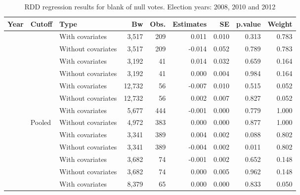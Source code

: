 \documentclass[
  12pt,
]{article}
\begin{document}
\begin{table}[H]

\caption{\label{tab:r.pct.bn}RDD regression results for blank of null votes. Election years: 2008, 2010 and 2012}
\centering
\begin{tabular}[t]{lllrrrrrr}
\toprule
Year & Cutoff & Type & Bw & Obs. & Estimates & SE & p.value & Weight\\
\midrule
 &  & With covariates & 3,517 & 209 & 0.011 & 0.010 & 0.313 & 0.783\\


 & \multirow{-2}{*}{\raggedright\arraybackslash 20000} & Without covariates & 3,517 & 209 & -0.014 & 0.052 & 0.789 & 0.783\\


 &  & With covariates & 3,192 & 41 & 0.014 & 0.032 & 0.659 & 0.164\\


 & \multirow{-2}{*}{\raggedright\arraybackslash 40000} & Without covariates & 3,192 & 41 & 0.000 & 0.004 & 0.984 & 0.164\\


 &  & With covariates & 12,732 & 56 & -0.007 & 0.010 & 0.515 & 0.052\\


 & \multirow{-2}{*}{\raggedright\arraybackslash 60000} & Without covariates & 12,732 & 56 & 0.002 & 0.007 & 0.827 & 0.052\\


 &  & With covariates & 5,677 & 444 & -0.001 & 0.000 & 0.779 & 1.000\\


\multirow{-8}{*}{\raggedright\arraybackslash 2008} & Pooled & Without covariates & 4,972 & 383 & 0.000 & 0.000 & 0.877 & 1.000\\
\cmidrule{1-9}
 &  & With covariates & 3,341 & 389 & 0.004 & 0.002 & 0.088 & 0.802\\


 & \multirow{-2}{*}{\raggedright\arraybackslash 20000} & Without covariates & 3,341 & 389 & -0.004 & 0.002 & 0.011 & 0.802\\


 &  & With covariates & 3,682 & 74 & -0.001 & 0.002 & 0.652 & 0.148\\


 & \multirow{-2}{*}{\raggedright\arraybackslash 40000} & Without covariates & 3,682 & 74 & 0.000 & 0.005 & 0.962 & 0.148\\


 &  & With covariates & 8,379 & 65 & 0.000 & 0.000 & 0.833 & 0.050\\



\end{tabular}
\end{table}
\end{document}

